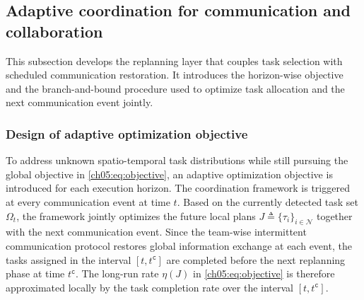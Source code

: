 \subsection{Adaptive coordination for communication and collaboration}
\label{ch05:subsec:coord-framework}

This subsection develops the replanning layer that couples task selection with
scheduled communication restoration. It introduces the horizon-wise objective
and the branch-and-bound procedure used to optimize task allocation and the next
communication event jointly.

\subsubsection{Design of adaptive optimization objective}
\label{ch05:subsubsec:new-obj}

To address unknown spatio-temporal task distributions while still pursuing the
global objective in \eqref{ch05:eq:objective}, an adaptive optimization
objective is introduced for each execution horizon. The coordination framework
is triggered at every communication event at time $t$. Based on the currently
detected task set $\Omega_t$, the framework jointly optimizes the future local
plans $J \triangleq \{\tau_i\}_{i \in \mathcal{N}}$ together with the next
communication event. Since the team-wise intermittent communication protocol
restores global information exchange at each event, the tasks assigned in the
interval $[t, t^{\texttt{c}}]$ are completed before the next replanning phase
at time $t^{\texttt{c}}$. The long-run rate $\eta(J)$ in
\eqref{ch05:eq:objective} is therefore approximated locally by the task
completion rate over the interval $[t, t^{\texttt{c}}]$.

